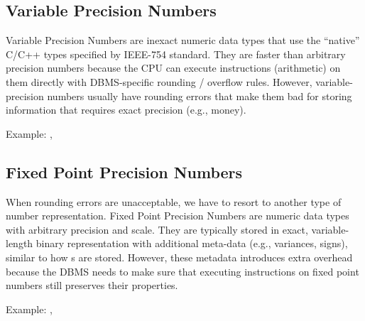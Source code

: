 \documentclass[11pt]{article}
\begin{document}
\subsection*{Variable Precision Numbers}
Variable Precision Numbers are inexact numeric data types that use the ``native'' C/C++ types specified by IEEE-754 standard. They are faster than arbitrary precision numbers because the CPU can execute instructions (arithmetic) on them directly with DBMS-specific rounding / overflow rules. However, variable-precision numbers usually have rounding errors that make them bad for storing information that requires exact precision (e.g., money).

Example: , 

\subsection*{Fixed Point Precision Numbers}
When rounding errors are unacceptable, we have to resort to another type of number representation. Fixed Point Precision Numbers are numeric data types with arbitrary precision and scale. They are typically stored in exact, variable-length binary representation with additional meta-data (e.g., variances, signs), similar to how s are stored. However, these metadata introduces extra overhead because the DBMS needs to make sure that executing instructions on fixed point numbers still preserves their properties.
    
Example: , 

\end{document}
